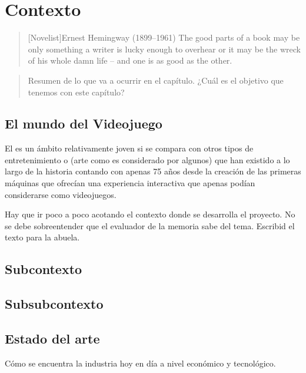 \chapter{Contexto}

\begin{quotation}[Novelist]{Ernest Hemingway (1899--1961)}
The good parts of a book may be only something a writer is lucky enough to overhear or it may be the wreck of his whole damn life -- and one is as good as the other.
\end{quotation}

\begin{abstract}
Resumen de lo que va a ocurrir en el capítulo. ¿Cuál es el objetivo que tenemos con este capítulo?
\end{abstract}

\section{El mundo del Videojuego}

 El \cite[Videojuego]{wiki:Videojuego} es un ámbito relativamente joven si se compara con otros tipos de entretenimiento o (arte como es considerado por algunos) que han existido a lo largo de la historia contando con apenas 75 años desde la creación de las primeras máquinas que ofrecían una experiencia interactiva que apenas podían considerarse como videojuegos.


Hay que ir poco a poco acotando el contexto donde se desarrolla el proyecto. No se debe sobreentender que el evaluador de la memoria sabe del tema. Escribid el texto para la abuela.

\section{Subcontexto}

\section{Subsubcontexto}

\section{Estado del arte}

Cómo se encuentra la industria hoy en día a nivel económico y tecnológico.